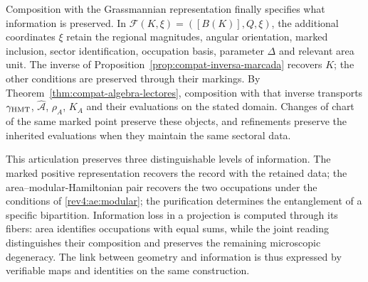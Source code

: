 Composition with the Grassmannian representation finally specifies
what information is preserved. In
\(\mathcal F(K,\xi)=([B(K)],Q,\xi)\), the additional coordinates
\(\xi\) retain the regional magnitudes, angular orientation,
marked inclusion, sector identification, occupation
basis, parameter \(\Delta\) and relevant area unit.
The inverse of Proposition~\ref{prop:compat-inversa-marcada}
recovers \(K\); the other conditions are preserved through their
markings. By Theorem~\ref{thm:compat-algebra-lectores}, composition
with that inverse transports \(\gamma_{\rm HMT}\),
\(\widehat{\mathcal A}\), \(\rho_A\), \(K_A\) and their evaluations
on the stated domain. Changes of chart of the same marked point
preserve these objects, and refinements preserve the inherited
evaluations when they maintain the same sectoral data.

This articulation preserves three distinguishable levels of information.
The marked positive representation recovers the record with the retained
data; the area--modular-Hamiltonian pair recovers the two
occupations under the conditions of \eqref{rev4:ae:modular}; the
purification determines the entanglement of a specific bipartition.
Information loss in a projection is computed through its fibers:
area identifies occupations with equal sums, while the joint
reading distinguishes their composition and preserves the remaining microscopic
degeneracy. The link between geometry and information is thus expressed
by verifiable maps and identities on the same construction.

